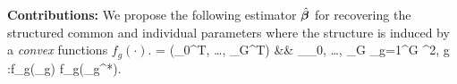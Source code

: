 {\bf Contributions:}
We propose the following estimator $\hat{\boldsymbol{\beta}}$ for recovering the structured common and individual parameters where the structure is induced by a \emph{convex} functions $f_g(\cdot)$.
\be
	\nr \label{eq:super}
	\hbbe = (\hbbe_0^T, \dots, \hbbe_G^T) &\in& \argmin_{\bbeta _0, \dots, \bbeta _G}  \sum_{g=1}^{G} ^2,
	 \quad \forall g \in [G]:f_g(\bbeta _g) \leq f_g(\bbeta _g^*).
\ee


